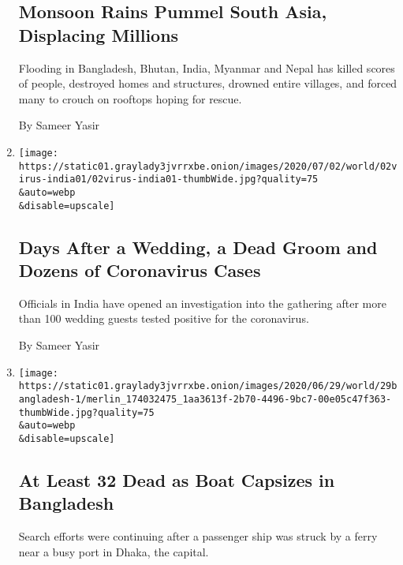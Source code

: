 \begin{enumerate}
  \hypertarget{monsoon-rains-pummel-south-asia-displacing-millions}{%
  \subsection{Monsoon Rains Pummel South Asia, Displacing
  Millions}\label{monsoon-rains-pummel-south-asia-displacing-millions}}

  Flooding in Bangladesh, Bhutan, India, Myanmar and Nepal has killed
  scores of people, destroyed homes and structures, drowned entire
  villages, and forced many to crouch on rooftops hoping for rescue.

  By Sameer Yasir
\item
  \href{/2020/07/02/world/asia/india-coronavirus-wedding-groom.html}{}

  \texttt{[image: https://static01.graylady3jvrrxbe.onion/images/2020/07/02/world/02virus-india01/02virus-india01-thumbWide.jpg?quality=75\\\&auto=webp\\\&disable=upscale]}

  \hypertarget{days-after-a-wedding-a-dead-groom-and-dozens-of-coronavirus-cases}{%
  \subsection{Days After a Wedding, a Dead Groom and Dozens of
  Coronavirus
  Cases}\label{days-after-a-wedding-a-dead-groom-and-dozens-of-coronavirus-cases}}

  Officials in India have opened an investigation into the gathering
  after more than 100 wedding guests tested positive for the
  coronavirus.

  By Sameer Yasir
\item
  \href{/2020/06/29/world/asia/bangladesh-ferry-capsize.html}{}

  \texttt{[image: https://static01.graylady3jvrrxbe.onion/images/2020/06/29/world/29bangladesh-1/merlin\_174032475\_1aa3613f-2b70-4496-9bc7-00e05c47f363-thumbWide.jpg?quality=75\\\&auto=webp\\\&disable=upscale]}

  \hypertarget{at-least-32-dead-as-boat-capsizes-in-bangladesh}{%
  \subsection{At Least 32 Dead as Boat Capsizes in
  Bangladesh}\label{at-least-32-dead-as-boat-capsizes-in-bangladesh}}

  Search efforts were continuing after a passenger ship was struck by a
  ferry near a busy port in Dhaka, the capital.


\end{enumerate}
